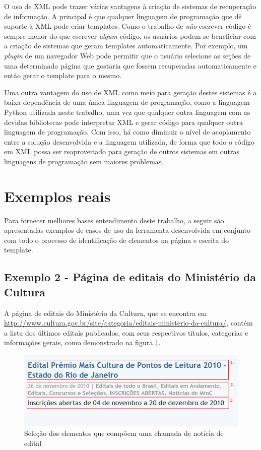 O uso de XML pode trazer várias vantagens à criação de sistemas de recuperação de informação. A principal é que qualquer linguagem de programação que dê suporte à XML pode criar templates. Como o trabalho de \emph{não} escrever código é sempre menor do que escrever \emph{algum} código, os usuários podem se beneficiar com a criação de sistemas que geram templates automaticamente. Por exemplo, um \emph{plugin} de um navegador Web pode permitir que o usuário selecione as seções de uma determinada página que gostaria que fossem recuperadas automaticamente e então gerar o template para o mesmo. 

Uma outra vantagem do uso de XML como meio para geração destes sistemas é a baixa dependência de uma única linguagem de programação, como a linguagem Python utilizada neste trabalho, uma vez que qualquer outra linguagem com as devidas bibliotecas pode interpretar XML e gerar código para qualquer outra linguagem de programação. Com isso, há como diminuir o nível de acoplamento entre a solução desenvolvida e a linguagem utilizada, de forma que todo o código em XML possa ser reaproveitado para geração de outros sistemas em outras linguagens de programação sem maiores problemas.

\pagebreak
\section{Exemplos reais}

Para fornecer melhores bases entendimento deste trabalho, a seguir são apresentadas exemplos de casos de uso da ferramenta desenvolvida em conjunto com todo o processo de identificação de elementos na página e escrita do template.

\subsection{Exemplo 2 - Página de editais do Ministério da Cultura}

A página de editais do Ministério da Cultura, que se encontra em \url{http://www.cultura.gov.br/site/categoria/editais-ministerio-da-cultura/}, contém a lista dos últimos editais publicados, com seus respectivos títulos, categorias e informações gerais, como demonstrado na figura \ref{minc}.

\begin{figure} [ht]
	\centering
	\includegraphics[scale=0.8]{minc.png}
	\caption{Seleção dos elementos que compõem uma chamada de notícia de edital}
	\label{minc}
\end{figure}

